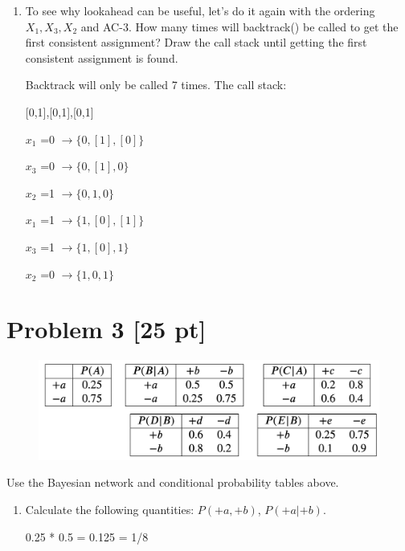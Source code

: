 \documentclass[12pt]{article}
\theoremstyle{case}
\begin{document}
\begin{enumerate} [label=(\alph*)]
                           $x_{3}$ =1 $\rightarrow \{1, [0,1], 1\}$

                           $x_{2}$ =0 $\rightarrow \{1, 0, 1\}$
    
    \item
    To see why lookahead can be useful, let's do it again with the ordering $X_1, X_3, X_2$ and AC-3. How many times will backtrack() be called to get the first consistent assignment? Draw the call stack until getting the first consistent assignment is found.

Backtrack will only be called 7 times. The call stack:

{[0,1],[0,1],[0,1]} 


                           $x_{1}$ =0 $\rightarrow \{0, [1], [0]\}$

                           $x_{3}$ =0 $\rightarrow \{0, [1], 0\}$

                           $x_{2}$ =1 $\rightarrow \{0, 1, 0\}$


                           $x_{1}$ =1 $\rightarrow \{1, [0], [1]\}$

                           $x_{3}$ =1 $\rightarrow \{1, [0], 1\}$

                           $x_{2}$ =0 $\rightarrow \{1, 0, 1\}$
   
\end{enumerate}

\newpage
\section*{Problem 3 [25 pt]}

\begin{figure}[h]
\includegraphics[width=.67\textwidth]{assignment4_3.png}
\centering
\end{figure}

Use the Bayesian network and conditional probability tables above.

\begin{enumerate} [label=(\alph*)]
\item Calculate the following quantities:
$P(+a, +b)$, $P(+a | +b)$.

0.25 * 0.5 = 0.125 = 1/8

\end{enumerate}
\end{document}
